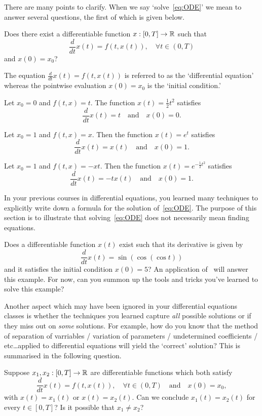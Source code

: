 There are many points to clarify. When we say `solve~\eqref{eq:ODE}' we mean to answer several questions, the first of which is given below.
\begin{q}[Existence]
	Does there exist a differentiable function $x:[0,T]\to \mathbb{R}$ such that
	\[
	\frac{d}{dt}x(t) = f(t,x(t)),\quad \forall t\in(0,T)
	\]
	and $x(0) = x_0$?
\end{q}
The equation $\frac{d}{dt}x(t) = f(t,x(t))$ is referred to as the `differential equation' whereas the pointwise evaluation $x(0) = x_0$ is the `initial condition.'
\begin{eg}
	Let $x_0 = 0$ and $f(t,x) = t$. The function $x(t) = \frac{1}{2}t^2$ satisfies
	\[
	\frac{d}{dt}x(t) = t\quad\text{and}\quad x(0) = 0.
	\]
\end{eg}
\begin{eg}
	Let $x_0 = 1$ and $f(t,x) = x$. Then the function $x(t) = e^t$ satisfies
	\[
	\frac{d}{dt}x(t) = x(t)\quad\text{and}\quad x(0) = 1.
	\]
\end{eg}
\begin{eg}
	Let $x_0 = 1$ and $f(t,x) = -xt$. Then the function $x(t) = e^{-\frac{1}{2}t^2}$ satisfies
	\[
	\frac{d}{dt}x(t) = -tx(t)\quad\text{and}\quad x(0) = 1.
	\]
\end{eg}
In your previous courses in differential equations, you learned many techniques to explicitly write down a formula for the solution of~\eqref{eq:ODE}. The purpose of this section is to illustrate that solving~\eqref{eq:ODE} does not necessarily mean finding equations.
\begin{eg}
	Does a differentiable function $x(t)$ exist such that its derivative is given by
	\[
	\frac{d}{dt}x(t) = \sin(\cos(\cos t))
	\]
	and it satisfies the initial condition $x(0) = 5$? An application of~ will answer this example. For now, can you summon up the tools and tricks you've learned to solve this example?
\end{eg}
Another aspect which may have been ignored in your differential equations classes is whether the techniques you learned capture \textit{all} possible solutions or if they miss out on \textit{some} solutions. For example, how do you know that the method of separation of varriables / variation of parameters / undetermined coefficients / etc\dots applied to differential equations will yield the `correct' solution? This is summarised in the following question.
\begin{q}[Uniqueness]
	Suppose $x_1,x_2:[0,T]\to \mathbb{R}$ are differentiable functions which both satisfy
	\[
	\frac{d}{dt}x(t) = f(t,x(t)),\quad \forall t\in(0,T)\quad\text{and}\quad x(0) = x_0,
	\]
	with $x(t) = x_1(t)$ or $x(t) = x_2(t)$. Can we conclude $x_1(t) = x_2(t)$ for every $t\in[0,T]$? Is it possible that $x_1\neq x_2$?
\end{q}
